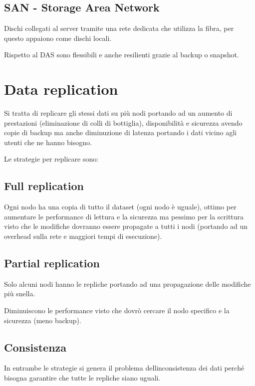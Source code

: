 \subsection{SAN - Storage Area
Network}\label{san---storage-area-network}

Dischi collegati al server tramite una rete dedicata che utilizza la
fibra, per questo appaiono come dischi locali.

Rispetto al DAS sono flessibili e anche resilienti grazie al backup o
snapshot.

\section{Data replication}\label{data-replication}

Si tratta di replicare gli stessi dati su più nodi portando ad un
aumento di prestazioni (eliminazione di colli di bottiglia),
disponibilità e sicurezza avendo copie di backup ma anche diminuzione di
latenza portando i dati vicino agli utenti che ne hanno bisogno.

Le strategie per replicare sono:

\subsection{Full replication}\label{full-replication}

Ogni nodo ha una copia di tutto il dataset (ogni nodo è uguale), ottimo
per aumentare le performance di lettura e la sicurezza ma pessimo per la
scrittura visto che le modifiche dovranno essere propagate a tutti i
nodi (portando ad un overhead sulla rete e maggiori tempi di
esecuzione).

\subsection{Partial replication}\label{partial-replication}

Solo alcuni nodi hanno le repliche portando ad una propagazione delle
modifiche più snella.

Diminuiscono le performance visto che dovrò cercare il nodo specifico e
la sicurezza (meno backup).

\subsection{Consistenza}\label{consistenza}

In entrambe le strategie si genera il problema
dell\textquotesingle inconsistenza dei dati perché bisogna garantire che
tutte le repliche siano uguali.

